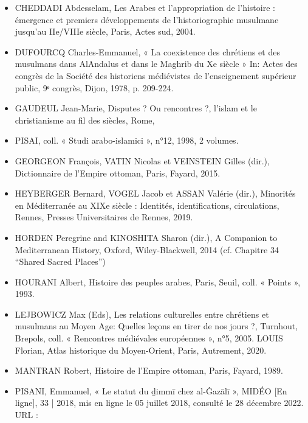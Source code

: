 \begin{itemize}
    \item   CHEDDADI Abdesselam, Les Arabes et l'appropriation de l'histoire : émergence et premiers développements de l'historiographie musulmane jusqu'au IIe/VIIIe siècle, Paris, Actes sud, 2004.   \item DUFOURCQ Charles-Emmanuel, « La coexistence des chrétiens et des musulmans dans AlAndalus et dans le Maghrib du Xe siècle » In: Actes des congrès de la Société des historiens médiévistes de l'enseignement supérieur public, 9ᵉ congrès, Dijon, 1978, p. 209-224.  
    
    \item GAUDEUL Jean-Marie, Disputes ? Ou rencontres ?, l’islam et le christianisme au fil des siècles, Rome,   \item PISAI, coll. « Studi arabo-islamici », n°12, 1998, 2 volumes.   \item GEORGEON François, VATIN Nicolas et VEINSTEIN Gilles (dir.), Dictionnaire de l’Empire ottoman, Paris, Fayard, 2015.   \item HEYBERGER Bernard, VOGEL Jacob et ASSAN Valérie (dir.), Minorités en Méditerranée au XIXe siècle : Identités, identifications, circulations, Rennes, Presses Universitaires de Rennes, 2019.    \item HORDEN Peregrine and KINOSHITA Sharon (dir.), A Companion to Mediterranean History, Oxford, Wiley-Blackwell, 2014 (cf. Chapitre 34 “Shared Sacred Places”)    \item HOURANI Albert, Histoire des peuples arabes, Paris, Seuil, coll. « Points », 1993.   \item LEJBOWICZ Max (Eds), Les relations culturelles entre chrétiens et musulmans au Moyen Age: Quelles leçons en tirer de nos jours ?, Turnhout, Brepols, coll. « Rencontres médiévales européennes », n°5, 2005.  LOUIS Florian, Atlas historique du Moyen-Orient, Paris, Autrement, 2020.   \item MANTRAN Robert, Histoire de l’Empire ottoman, Paris, Fayard, 1989.   \item PISANI, Emmanuel,  « Le statut du ḏimmī chez al-Ġazālī », MIDÉO [En ligne], 33 | 2018, mis en ligne le 05 juillet 2018, consulté le 28 décembre 2022. URL : 

\end{itemize}

